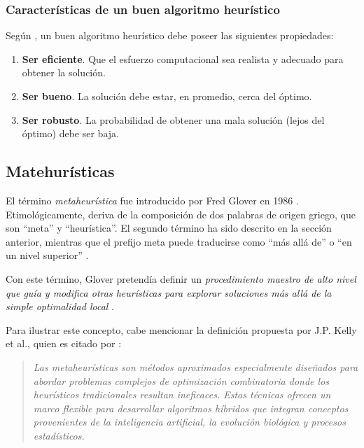 \documentclass[12pt,titlepage,twoside,openright]{book}
\begin{document}
\subsubsection{Características de un buen algoritmo heurístico}

Según \citep{antonioSuarez2014}, un buen algoritmo heurístico debe poseer las siguientes propiedades:

\begin{enumerate}[label=\alph*.]
	\item \textbf{Ser eficiente}. Que el esfuerzo computacional sea realista y adecuado para obtener la solución.
	\item \textbf{Ser bueno}. La solución debe estar, en promedio, cerca del óptimo.
	\item \textbf{Ser robusto}. La probabilidad de obtener una mala solución (lejos del óptimo) debe ser baja.
\end{enumerate}

\subsection{Matehurísticas}

El término \textit{metaheurística} fue introducido por Fred Glover en 1986 \citep{antonioSuarez2014}. Etimológicamente, deriva de la composición de dos palabras de origen griego, que son “meta” y “heurística”. El segundo término ha sido descrito en la sección anterior, mientras que el prefijo meta puede traducirse como “más allá de” o “en un nivel superior” \citep{duarte2007metaheuristicas}.

Con este término, Glover pretendía definir un \textit{procedimiento maestro de alto nivel que guía y modifica otras heurísticas para explorar soluciones más allá de la simple optimalidad local} \citep{duarte2007metaheuristicas}.

Para ilustrar este concepto, cabe mencionar la definición propuesta por J.P. Kelly et al., quien es citado por \citep{duarte2007metaheuristicas}:

\begin{quote}
	\textit{Las metaheurísticas son métodos aproximados especialmente diseñados para abordar problemas complejos de optimización combinatoria donde los heurísticos tradicionales resultan ineficaces. Estas técnicas ofrecen un marco flexible para desarrollar algoritmos híbridos que integran conceptos provenientes de la inteligencia artificial, la evolución biológica y procesos estadísticos.}
\end{quote}
\end{document}
